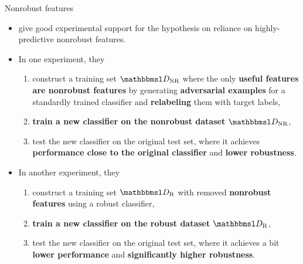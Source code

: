 \documentclass{beamer}
\newcommand{\citet}[1]{{\color{citecolor}\relscale{0.8}\textcite{#1}}}
\newcommand{\citep}[1]{{\color{citecolor}\relscale{0.8}[\textcite{#1}]}}
\begin{document}
\begin{frame}[allowframebreaks=0.9]{Nonrobust features}
	\begin{itemize}
		\item \citet{Ilyas:2019:AENBTF} give good experimental support for the hypothesis on reliance on highly-predictive nonrobust features.
		\item In one experiment, they
		\begin{enumerate}
			\item construct a training set $\set D_\text{NR}$ where the only \textbf{useful features are nonrobust features} by generating \textbf{adversarial examples} for a standardly trained classifier and \textbf{relabeling} them with target labels,
			\item \textbf{train a new classifier on the nonrobust dataset} $\set D_\text{NR}$,
			\item test the new classifier on the original test set, where it achieves \textbf{performance close to the original classifier} and \textbf{lower robustness}.
		\end{enumerate}		
		\item In another experiment, they
		\begin{enumerate}
			\item construct a training set $\set D_\text{R}$ with removed \textbf{nonrobust features} using a robust classifier,
			\item \textbf{train a new classifier on the robust dataset} $\set D_\text{R}$,
			\item test the new classifier on the original test set, where it achieves a bit \textbf{lower performance} and \textbf{significantly higher robustness}.
		\end{enumerate}
	\end{itemize}

\end{frame}
\end{document}
